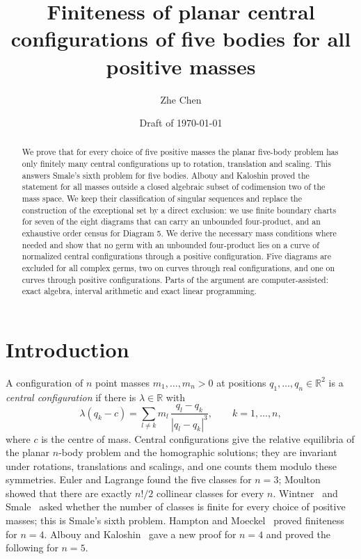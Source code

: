 \documentclass[11pt]{amsart}
\title[Five-body central configurations]{Finiteness of planar central configurations of five
bodies for all positive masses}
\author{Zhe Chen}
\date{Draft of \today}
\theoremstyle{definition}
\theoremstyle{remark}
\newcommand{\R}{\mathbb{R}}
\begin{document}
\begin{abstract}
We prove that for every choice of five positive masses the planar five-body problem has only
finitely many central configurations up to rotation, translation and scaling.  This answers
Smale's sixth problem for five bodies.  Albouy and Kaloshin proved the statement for all masses
outside a closed algebraic subset of codimension two of the mass space.  We keep their
classification of singular sequences and replace the construction of the exceptional set by a
direct exclusion: we use finite boundary charts for seven of the eight diagrams that can carry
an unbounded four-product, and an exhaustive order census for Diagram 5.  We derive the
necessary mass conditions where needed and show that no germ with an unbounded four-product
lies on a curve of normalized central configurations through a positive configuration.  Five
diagrams are excluded for all complex germs, two on curves through real
configurations, and one on curves through positive configurations.  Parts of the argument are
computer-assisted: exact algebra, interval arithmetic and exact linear programming.
\end{abstract}

\maketitle

\tableofcontents


\section{Introduction}\label{sec:intro}

A configuration of $n$ point masses $m_1,\dots,m_n>0$ at positions $q_1,\dots,q_n\in\R^2$ is a
\emph{central configuration} if there is $\lambda\in\R$ with
\[
  \lambda (q_k-c) = \sum_{l\neq k} m_l\,\frac{q_l-q_k}{|q_l-q_k|^3},\qquad k=1,\dots,n,
\]
where $c$ is the centre of mass.  Central configurations give the relative equilibria of the
planar $n$-body problem and the homographic solutions; they are invariant under rotations,
translations and scalings, and one counts them modulo these symmetries.  Euler and Lagrange
found the five classes for $n=3$; Moulton~\cite{Moulton} showed that there are exactly $n!/2$
collinear classes for every $n$.  Wintner~\cite{Wintner} and Smale~\cite{Smale} asked whether
the number of classes is finite for every choice of positive masses; this is Smale's sixth
problem.  Hampton and Moeckel~\cite{HM} proved finiteness for $n=4$.  Albouy and
Kaloshin~\cite{AK} gave a new proof for $n=4$ and proved the following for $n=5$.
\end{document}
